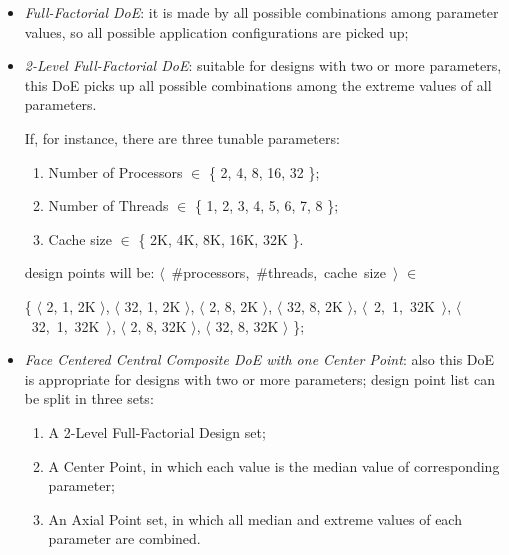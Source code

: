 \begin{itemize}

    \item \textit{Full-Factorial DoE}: it is made by all possible combinations among parameter values, so all possible application configurations are picked up;
 
    \item \textit{2-Level Full-Factorial DoE}: suitable for designs with two or more parameters, this DoE picks up all possible combinations among the extreme values of all parameters.
    
    If, for instance, there are three tunable parameters:
    
    \begin{enumerate}
    
        \item Number of Processors $\in$ \{ 2, 4, 8, 16, 32 \};
        
        \item Number of Threads $\in$ \{ 1, 2, 3, 4, 5, 6, 7, 8 \};
        
        \item Cache size $\in$ \{ 2K, 4K, 8K, 16K, 32K \}.
    
    \end{enumerate}
    
    design points will be: \hbox{$\langle$ \#processors, \#threads, cache size $\rangle$} $\in$
    
    \{ $\langle$ 2, 1, 2K $\rangle$, $\langle$ 32, 1, 2K $\rangle$, $\langle$ 2, 8, 2K $\rangle$, $\langle$ 32, 8, 2K $\rangle$, \hbox{$\langle$ 2, 1, 32K $\rangle$}, \hbox{$\langle$ 32, 1, 32K $\rangle$}, $\langle$ 2, 8, 32K $\rangle$, $\langle$ 32, 8, 32K $\rangle$ \};

    \item \textit{Face Centered Central Composite DoE with one Center Point}: also this DoE is appropriate for designs with two or more parameters; design point list can be split in three sets:
    
     \begin{enumerate}
    
        \item A 2-Level Full-Factorial Design set;
        
        \item A Center Point, in which each value is the median value of corresponding parameter;
        
        \item An Axial Point set, in which all median and extreme values of each parameter are combined.
    

\end{enumerate}
\end{itemize}
